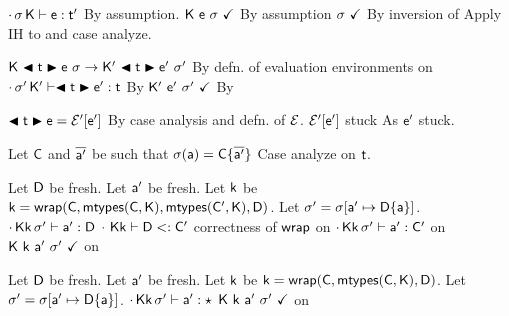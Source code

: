 \documentclass[acmlarge, anonymous, authordraft]{acmart}
\begin{document}
\begin{proofy}
\stepp[base] $\EnvType\cdot\s\K\e\tp$ \basis By assumption.
\stepp[progform] ${\sf{K}}~{\sf{e}}~\sigma~\checkmark$ \basis By assumption
\stepp[inpswf] $\sigma~\checkmark$ \basis By inversion of 
\stepp Apply IH to  and case analyze.
\begin{casel}
  \caseof{ \begin{iknown}
    \stepp[kred] $\Reduce\K\e\s\Kp\ep\sp$
    \stepp[kbase] $\WFp\Kp{\ep~\sp}$
    \stepp $\EnvType\cdot\sp\Kp\ep\tp$
    \end{iknown}} 
  \begin{proofy}
  \stepp $\Reduce\K{\BehCast{\t}{\e}}\s\Kp{\BehCast{\t}{\ep}}\sp$ \basis By defn. of evaluation environments on 
  \stepp[ktype] $\EnvType\cdot\sp\Kp{\BehCast\t\ep}\t$ \basis By 
  \stepp $\WFp\Kp{\ep~\sp}$ \basis By 
  \end{proofy}
  \begin{proofy}
    \stepp $\BehCast\t\e = \EE'[\ep]$ \basis By case analysis and defn. of $\mathcal{E}$.
    \stepp $\mathcal{E}'[{{{\sf{e'}}}}]$ stuck \basis As ${{{\sf{e'}}}}$ stuck.
  \end{proofy}
  \caseof{$\e = \a$}
  \begin{proofy}
    \stepp Let ${\sf{C}}$ and $\overline{{\sf{a}}'}$ be such that $\sigma({\sf{a}}) = {\sf{C}}\{\overline{{\sf{a}}'}\}$
    \stepp Case analyze on $\t$.
    \begin{casel}
      \caseof{$\t = \Cp$}
      \begin{proofy}
        \stepp Let ${\sf{D}}$ be fresh.
        \stepp Let ${\sf{a}}'$ be fresh.
        \stepp[wcorr] Let ${\sf{k}}$ be ${\sf{k}} = {\sf{wrap}}({\sf{C}},{\sf{mtypes}}({\sf{C}},{\sf{K}}),{\sf{mtypes}}({\sf{C'}},{\sf{K}}),{\sf{D}})$.
        \stepp Let ${{\sigma'}} = \sigma[{\sf{a}}' \mapsto {\sf{D}}\{{\sf{a}}\}]$.
        \stepp[b2] $\cdot\,{\sf{K}}{\sf{k}}\,{{\sigma'}}\vdash {\sf{a}}' : {\sf{D}}$ \basis {}
        \stepp[b1] $\cdot~{\sf{K}}{\sf{k}}\vdash {\sf{D}}<: {\sf{C'}}$ \basis correctness of ${\sf{wrap}}$ on 
        \stepp[wth] $\cdot\,{\sf{K}}{\sf{k}}\,{{\sigma'}}\vdash {\sf{a}}' : {\sf{C'}}$ \basis {} on 
        \stepp ${\sf{K}} ~ {\sf{k}}~{\sf{a}}'~{{\sigma'}}~\checkmark$ \basis {} on 
      \end{proofy}
      \caseof{$\t = \any$}
      \begin{proofy}
        \stepp Let ${\sf{D}}$ be fresh.
        \stepp Let ${\sf{a}}'$ be fresh.
        \stepp[wcorr2] Let ${\sf{k}}$ be ${\sf{k}} = {\sf{wrap}}({\sf{C}},{\sf{mtypes}}({\sf{C}},{\sf{K}}),{\sf{D}})$.
        \stepp Let ${{\sigma'}} = \sigma[{\sf{a}}' \mapsto {\sf{D}}\{{\sf{a}}\}]$.
        \stepp[b21] $\cdot\,{\sf{K}}{\sf{k}}\,{{\sigma'}}\vdash {\sf{a}}' : \star$ \basis {}
        \stepp ${\sf{K}} ~ {\sf{k}}~{\sf{a}}'~{{\sigma'}}~\checkmark$ \basis {} on 
      \end{proofy}
    \end{casel}
  \end{proofy}
\end{casel}
\end{proofy}
\end{document}
